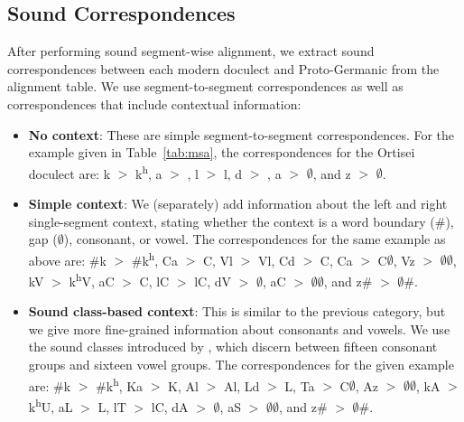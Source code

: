\documentclass[a4paper]{article}
\begin{document}
\subsection{Sound Correspondences}

After performing sound segment-wise alignment, we extract sound correspondences between each modern doculect and Proto-Germanic from the alignment table.
We use segment-to-segment correspondences as well as correspondences that include contextual information:

\begin{itemize}
\item
\textbf{No context}:
These are simple segment-to-segment correspondences.
For the example given in Table~\ref{tab:msa}, the correspondences for the Ortisei doculect are:
k $>$ k\textsuperscript{h}, a $>$ \textopeno, l $>$ l, d $>$ , a $>$ $\emptyset$, and z $>$ $\emptyset$.

\item
\textbf{Simple context}:
We (separately) add information about the left and right single-segment context, stating whether the context is a word boundary (\#), gap ($\emptyset$), consonant, or vowel.
The correspondences for the same example as above are:
\#k $>$ \#k\textsuperscript{h}, Ca $>$ C\textopeno, Vl $>$ Vl, Cd $>$ C, Ca $>$ C$\emptyset$, Vz $>$ $\emptyset\emptyset$,
kV $>$ k\textsuperscript{h}V, aC $>$ \textopeno{}C, lC $>$ lC, dV $>$ $\emptyset$, aC $>$ $\emptyset\emptyset$, and z\# $>$ $\emptyset$\#.

\item
\textbf{Sound class-based context}:
This is similar to the previous category, but we give more fine-grained information about consonants and vowels.
We use the sound classes introduced by \citet{list2012sca:}, which discern between fifteen consonant groups and sixteen vowel groups.
The correspondences for the given example are:
\#k $>$ \#k\textsuperscript{h}, Ka $>$ K\textopeno, Al $>$ Al, Ld $>$ L, Ta $>$ C$\emptyset$, Az $>$ $\emptyset\emptyset$,
kA $>$ k\textsuperscript{h}U, aL $>$ \textopeno{}L, lT $>$ lC, dA $>$ $\emptyset$, aS $>$ $\emptyset\emptyset$, and z\# $>$ $\emptyset$\#.
\end{itemize}

\end{document}
